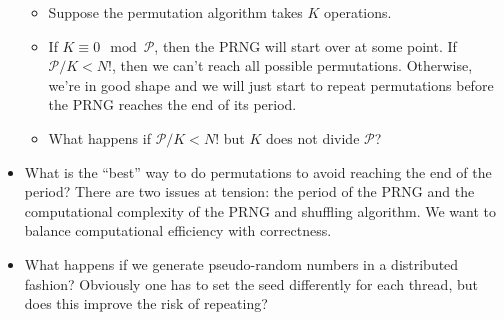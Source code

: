 \documentclass[12pt]{article}
\begin{document}
\begin{itemize}
\begin{itemize}
\item Suppose the permutation algorithm takes $K$ operations.
\item If $K \equiv 0 \mod \mathcal{P}$, then the PRNG will start over at some point. If $\mathcal{P}/K < N!$, then we can't reach all possible permutations.
Otherwise, we're in good shape and we will just start to repeat permutations before the PRNG reaches the end of its period.
\item What happens if $\mathcal{P}/K < N!$ but $K$ does not divide $\mathcal{P}$?
\end{itemize}
\item What is the ``best'' way to do permutations to avoid reaching the end of the period?
There are two issues at tension: the period of the PRNG and the computational complexity of the PRNG and shuffling algorithm.
We want to balance computational efficiency with correctness.
\item What happens if we generate pseudo-random numbers in a distributed fashion?
Obviously one has to set the seed differently for each thread, but does this improve the risk of repeating?
\end{itemize}



\end{document}
